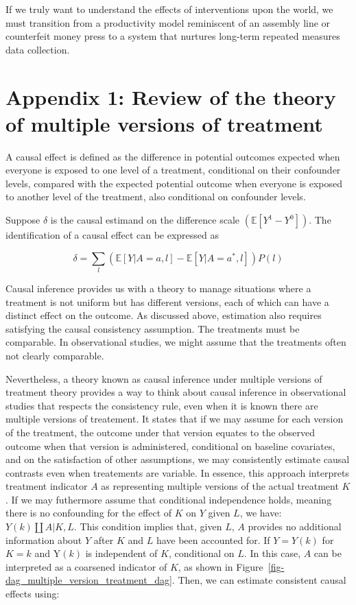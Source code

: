 \documentclass[
  singlecolumn]{report}
\begin{document}
If we truly want to understand the effects of interventions upon the
world, we must transition from a productivity model reminiscent of an
assembly line or counterfeit money press to a system that nurtures
long-term repeated measures data collection.

\newpage{}

\hypertarget{appendix-1-review-of-the-theory-of-multiple-versions-of-treatment}{%
\section{Appendix 1: Review of the theory of multiple versions of
treatment}\label{appendix-1-review-of-the-theory-of-multiple-versions-of-treatment}}

A causal effect is defined as the difference in potential outcomes
expected when everyone is exposed to one level of a treatment,
conditional on their confounder levels, compared with the expected
potential outcome when everyone is exposed to another level of the
treatment, also conditional on confounder levels.

Suppose \(\delta\) is the causal estimand on the difference scale
\((\mathbb{E}[Y^1 - Y^0])\). The identification of a causal effect can
be expressed as

\[ \delta = \sum_l \left( \mathbb{E}[Y|A=a,l] - \mathbb{E}[Y|A=a^*,l] \right) P(l)\]

Causal inference provides us with a theory to manage situations where a
treatment is not uniform but has different versions, each of which can
have a distinct effect on the outcome. As discussed above, estimation
also requires satisfying the causal consistency assumption. The
treatments must be comparable. In observational studies, we might assume
that the treatments often not clearly comparable.

Nevertheless, a theory known as causal inference under multiple versions
of treatment theory provides a way to think about causal inference in
observational studies that respects the consistency rule, even when it
is known there are multiple versions of treatement. It states that if we
may assume for each version of the treatment, the outcome under that
version equates to the observed outcome when that version is
administered, conditional on baseline covariates, and on the
satisfaction of other assumptions, we may consistently estimate causal
contrasts even when treatements are variable. In essence, this approach
interprets treatment indicator \(A\) as representing multiple versions
of the actual treatment \(K\). If we may futhermore assume that
conditional independence holds, meaning there is no confounding for the
effect of \(K\) on \(Y\) given \(L\), we have: \(Y(k)\coprod A|K,L\).
This condition implies that, given \(L\), \(A\) provides no additional
information about \(Y\) after \(K\) and \(L\) have been accounted for.
If \(Y = Y(k)\) for \(K = k\) and Y\((k)\) is independent of \(K\),
conditional on \(L\). In this case, \(A\) can be interpreted as a
coarsened indicator of \(K\), as shown in
Figure~\ref{fig-dag_multiple_version_treatment_dag}. Then, we can
estimate consistent causal effects using:
\end{document}
